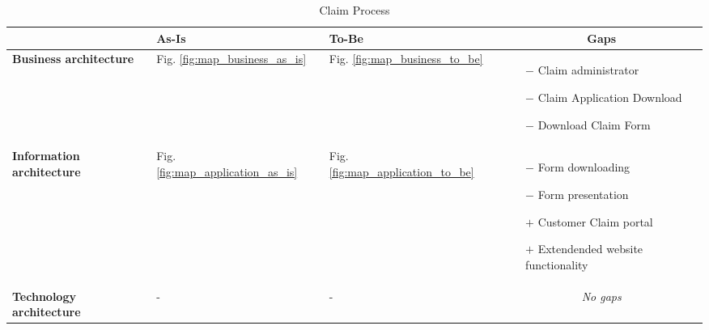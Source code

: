 \begin{table}[H]
	\centering
	\begin{tabular}{|p{2.4cm}|l|l|p{7.5cm}|}
		\hline
		\textbf{} & \textbf{As-Is} & \textbf{To-Be} & \multicolumn{1}{c|}{\textbf{Gaps}} \\ \hline
		\textbf{Business architecture} &Fig. \ref{fig:map_business_as_is}  & Fig. \ref{fig:map_business_to_be} & \begin{itemize} \vspace{-0.5cm}
		\item[$-$] Claim administrator
		\item[$-$] Claim Application Download
		\item[$-$] Download Claim Form
		\end{itemize} \vspace{-0.7cm}\\ \hline 

		\textbf{Information architecture} &Fig. \ref{fig:map_application_as_is}  & Fig. \ref{fig:map_application_to_be} & \begin{itemize}\vspace{-0.5cm}
		\item[$-$] Form downloading
		\item[$-$] Form presentation
		\item[$+$] Customer Claim portal
		\item[$+$] Extendended website functionality
		\end{itemize}\vspace{-0.7cm} \\ \hline

		\textbf{Technology architecture} & - & - & \multicolumn{1}{c|}{\emph{No gaps}} \\ \hline
	\end{tabular}	
	\caption{Claim Process}
	\label{table:gaps_claim}
\end{table}

